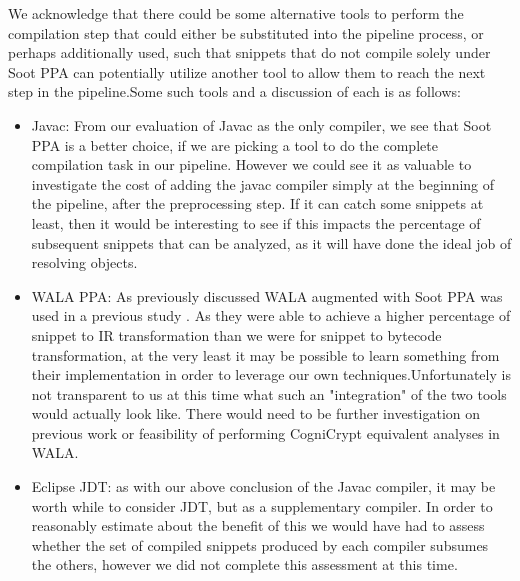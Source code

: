 \documentclass[10pt, conference]{IEEEtran}
\begin{document}
We acknowledge that there could be some alternative tools to perform the compilation step that could either be substituted into the pipeline process, or perhaps additionally used, such that snippets that do not compile solely under Soot PPA can potentially utilize another tool to allow them to reach the next step in the pipeline.Some such tools and a discussion of each is as follows:
\begin{itemize}
\item
Javac: From our evaluation of Javac as the only compiler, we see that Soot PPA is a better choice, if we are picking a tool to do the complete compilation task in our pipeline. However we could see it as valuable to investigate the cost of adding the javac compiler simply at the beginning of the pipeline, after the preprocessing step. If it can catch some snippets at least, then it would be interesting to see if this impacts the percentage of subsequent snippets that can be analyzed, as it will have done the ideal job of resolving objects.
\item
WALA PPA: As previously discussed WALA augmented with Soot PPA was used in a previous study \cite{7958574}. As they were able to achieve a higher percentage of snippet to IR transformation than we were for snippet to bytecode transformation, at the very least it may be possible to learn something from their implementation in order to leverage our own techniques.Unfortunately is not transparent to us at this time what such an "integration" of the two tools would actually look like. There would need to be further investigation on previous work or feasibility of performing CogniCrypt equivalent analyses in WALA.

\item
Eclipse JDT: as with our above conclusion of the Javac compiler, it may be worth while to consider JDT, but as a supplementary compiler.
In order to reasonably estimate about the benefit of this we would have had to assess whether the set of compiled snippets produced by each compiler subsumes the others, however we did not complete this assessment at this time.

\end{itemize}
\end{document}

